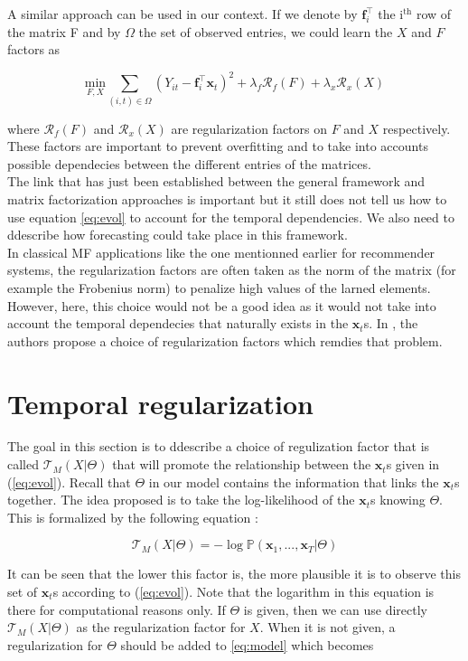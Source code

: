 \documentclass{article}
\begin{document}
A similar approach can be used in our context. If we denote by $\mathbf{f}_i^\top$ the i$^\text{th}$ row of the matrix F and by $\Omega$ the set of observed entries, we could learn the $X$ and $F$ factors as

\begin{equation}
\underset{F,X}{\text{min}} \sum_{(i,t) \in \Omega} (Y_{it} - \mathbf{f}_i^\top\mathbf{x}_t)^2 + \lambda_f \mathcal{R}_f(F) + \lambda_x \mathcal{R}_x(X)
\label{eq:model}
\end{equation}

where $\mathcal{R}_f(F)$ and $\mathcal{R}_x(X)$ are regularization factors on $F$ and $X$ respectively. These factors are important to prevent overfitting and to take into accounts possible dependecies between the different entries of the matrices. \\
The link that has just been established between the general framework and matrix factorization approaches is important but it still does not tell us how to use equation \ref{eq:evol} to account for the temporal dependencies. We also need to ddescribe how forecasting could take place in this framework. \\
In classical MF applications like the one mentionned earlier for recommender systems, the regularization factors are often taken as the norm of the matrix (for example the Frobenius norm) to penalize high values of the larned elements. However, here, this choice would not be a good idea as it would not take into account the temporal dependecies that naturally exists in the $\mathbf{x}_t$s. In \cite{TRMF}, the authors propose a choice of regularization factors which remdies that problem.

\section{Temporal regularization}

The goal in this section is to ddescribe a choice of regulization factor that is called $\mathcal{T}_M(X | \Theta)$ that will promote the relationship between the $\mathbf{x}_t$s given in (\ref{eq:evol}).
Recall that $\Theta$ in our model contains the information that links the $\mathbf{x}_t$s together. The idea proposed is to take the log-likelihood of the $\mathbf{x}_t$s knowing $\Theta$. This is formalized by the following equation :

$$\mathcal{T}_M(X | \Theta) = -\log{\mathbb{P}(\mathbf{x}_1, ..., \mathbf{x}_T|\Theta)}$$

It can be seen that the lower this factor is, the more plausible it is to observe this set of $\mathbf{x}_t$s according to (\ref{eq:evol}). Note that the logarithm in this equation is there for computational reasons only. If $\Theta$ is given, then we can use directly $\mathcal{T}_M(X | \Theta)$ as the regularization factor for $X$. When it is not given, a regularization for $\Theta$ should be added to \ref{eq:model} which becomes
\end{document}
